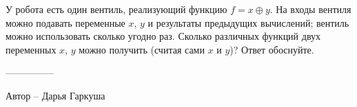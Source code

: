 \question
У робота есть один вентиль, реализующий функцию $f=x\oplus y$. На входы вентиля можно подавать переменные $x$, $y$ и результаты предыдущих вычислений; вентиль можно использовать сколько угодно раз. Сколько различных функций двух переменных $x$, $y$ можно получить (считая сами $x$ и $y$)? Ответ обоснуйте.

---------------

Автор -- Дарья Гаркуша
